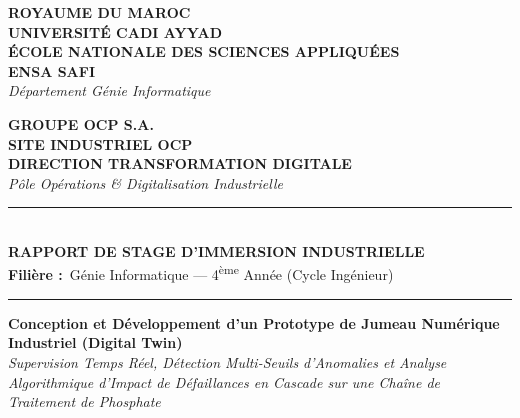 ﻿\begin{titlepage}
\begin{center}

\begin{minipage}{0.48\textwidth}
    \begin{center}
        \textbf{\large ROYAUME DU MAROC}\\[2pt]
        \textbf{\footnotesize UNIVERSITÉ CADI AYYAD}\\[2pt]
        \textbf{\small ÉCOLE NATIONALE DES SCIENCES APPLIQUÉES}\\[2pt]
        \textbf{\footnotesize ENSA SAFI}\\[2pt]
        \footnotesize \textit{Département Génie Informatique}
    \end{center}
\end{minipage}
\hfill
\begin{minipage}{0.48\textwidth}
    \begin{center}
        \textbf{\large GROUPE OCP S.A.}\\[2pt]
        \textbf{\small SITE INDUSTRIEL OCP}\\[2pt]
        \textbf{\footnotesize DIRECTION TRANSFORMATION DIGITALE}\\[2pt]
        \footnotesize \textit{Pôle Opérations \& Digitalisation Industrielle}
    \end{center}
\end{minipage}

\vspace{1.2cm}

\rule{\linewidth}{1.4pt}\\[0.35cm]
{\Large \textbf{\color{ocpblue} RAPPORT DE STAGE D'IMMERSION INDUSTRIELLE}}\\[0.2cm]
{\small \textbf{Filière :}\ Génie Informatique --- 4\textsuperscript{ème} Année (Cycle Ingénieur)}\\[0.35cm]
\rule{\linewidth}{1.4pt}

\vspace{1.0cm}

{\LARGE \textbf{\color{ocpnavy} Conception et Développement d'un Prototype de Jumeau Numérique Industriel (Digital Twin)}}\\[0.4cm]
{\large \textit{Supervision Temps Réel, Détection Multi-Seuils d'Anomalies et Analyse Algorithmique d'Impact de Défaillances en Cascade sur une Chaîne de Traitement de Phosphate}}

\vspace{1.4cm}


\end{center}
\end{titlepage}
